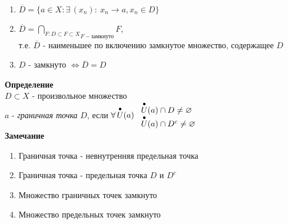 \documentclass[12pt]{article}
\begin{document}
\begin{enumerate}
    \item $\overline{D} = \{a \in X: \exists\,(x_n):\ x_n\rightarrow a, x_n \in D\}$
    \item $\overline{D} = \underset{F-\text{замкнуто}}{\bigcap_{F:D\subset F\subset X}} F$,\\
    т.е. $\overline{D}$ - наименьшее по включению замкнутое множество, содержащее $D$
    \item $D$ - замкнуто $\Leftrightarrow \overline{D} = D$
\end{enumerate}
\textbf{Определение}\\
$D\subset X$ - произвольное множество\\
$a$ - \textit{граничная точка} $D$, если $\forall\,\overdot{U}(a)\ \begin{array}{l}
     \overdot{U}(a) \cap D \neq \varnothing \\
     \overdot{U}(a) \cap D^c  \neq \varnothing
\end{array}$\\
\textbf{Замечание}
\begin{enumerate}
    \item Граничная точка - невнутренняя предельная точка
    \item Граничная точка - предельная точка $D$ и $D^c$
    \item Множество граничных точек замкнуто
    \item Множество предельных точек замкнуто
\end{enumerate}
\end{document}
